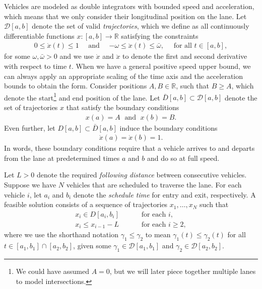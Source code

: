 \documentclass[a4paper]{article}
\theoremstyle{definition}
\theoremstyle{plain}
\begin{document}
Vehicles are modeled as double integrators with bounded speed and acceleration,
which means that we only consider their longitudinal position on the lane. Let
$\mathcal{D}[a,b]$ denote the set of valid \emph{trajectories}, which we define as all
continuously differentiable functions $x : [a,b] \rightarrow \mathbb{R}$ satisfying the
constraints
\begin{align}
  0 \leq \dot{x}(t) \leq 1 \quad \text{ and } \quad
  {-\omega} \leq \ddot{x}(t) \leq \bar{\omega} , \quad \text{ for all } t \in [a,b] ,
\end{align}
for some $\omega, \bar{\omega} > 0$ and we use $\dot{x}$ and $\ddot{x}$ to
denote the first and second derivative with respect to time $t$. When we have a
general positive speed upper bound, we can always apply an appropriate scaling
of the time axis and the acceleration bounds to obtain the form.
%
Consider positions $A, B \in \mathbb{R}$, such that $B \geq A$, which denote the
start\footnote{We could have assumed $A=0$, but we will later piece together
  multiple lanes to model intersections.} and end position of the lane.
%
Let $\bar{D}[a, b] \subset \mathcal{D}[a, b]$ denote the set of trajectories $x$ that
satisfy the boundary conditions
\begin{align}
  x(a) = A \; \text{ and } \; x(b) = B .
\end{align}
Even further, let $D[a,b] \subset \bar{D}[a, b]$ induce the boundary conditions
\begin{align}
  \dot{x}(a) = \dot{x}(b) = 1 .
\end{align}
In words, these boundary conditions require that a vehicle arrives to and
departs from the lane at predetermined times $a$ and $b$ and do so at full
speed.

Let $L > 0$ denote the required \textit{following distance} between consecutive
vehicles.
%
Suppose we have $N$ vehicles that are scheduled to traverse the lane. For each
vehicle $i$, let $a_{i}$ and $b_{i}$ denote the \textit{schedule time} for entry
and exit, respectively. A feasible solution consists of a sequence of
trajectories $x_{1}, \dots, x_{N}$ such that
\begin{subequations}\label{eq:feasibility}
\begin{align}
x_{i} \in D[a_{i}, b_{i}] \quad \quad & \text{ for each } i, \\
x_{i} \leq x_{i-1} - L \quad \quad &\text{ for each } i \geq 2,
\end{align}
\end{subequations}
%
where we use the shorthand notation $\gamma_{1} \leq \gamma_{2}$ to mean
$\gamma_{1}(t) \leq \gamma_{2}(t)$ for all
$t \in [a_{1}, b_{1}] \cap [a_{2}, b_{2}]$, given some
$\gamma_{1} \in \mathcal{D}[a_{1}, b_{1}]$ and
$\gamma_{2} \in \mathcal{D}[a_{2}, b_{2}]$.
\end{document}
